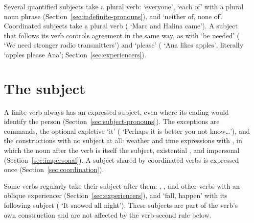 Several quantified subjects take a plural verb:  `everyone',  `each of' with a plural noun phrase (Section~\ref{sec:indefinite-pronouns}), and  `neither of, none of'.
Coordinated subjects take a plural verb ( `Marc and Halina came'). A subject that follows its verb controls agreement in the same way, as with  `be needed' ( `We need stronger radio transmitters') and  `please' ( `Ana likes apples', literally `apples please Ana'; Section~\ref{sec:experiencers}).

\section{The subject}\label{sec:clause-subject}
A finite verb always has an expressed subject, even where its ending would identify the person (Section~\ref{sec:subject-pronouns}). The exceptions are commands, the optional expletive `it' ( `Perhaps it is better you not know\ldots'), and the constructions with no subject at all: weather and time expressions with , in which the noun after the verb is itself the subject, existential , and impersonal  (Section~\ref{sec:impersonal}). A subject shared by coordinated verbs is expressed once (Section~\ref{sec:coordination}).

Some verbs regularly take their subject after them: , ,  and other verbs with an oblique experiencer (Section~\ref{sec:experiencers}), and  `fall, happen' with its following subject ( `It snowed all night'). These subjects are part of the verb's own construction and are not affected by the verb-second rule below.

